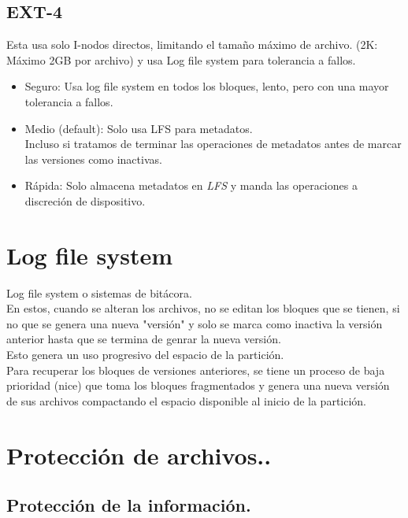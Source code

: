 \section{EXT-4}
Esta usa solo I-nodos directos, limitando el tama\~{n}o m\'{a}ximo de archivo.
(2K: M\'{a}ximo 2GB por archivo) y usa Log file system para tolerancia a fallos.
\begin{itemize}
	\item Seguro: Usa log file system en todos los bloques, lento, pero con una mayor tolerancia a fallos.
	\item Medio (default): Solo usa LFS para metadatos.\\
		Incluso si tratamos de terminar las operaciones de metadatos antes de marcar las versiones como inactivas.
	\item R\'{a}pida: Solo almacena metadatos en \textit{LFS} y manda las operaciones a discreci\'{o}n de dispositivo.
\end{itemize}

\chapter{Log file system}
Log file system o sistemas de bit\'{a}cora.\\
En estos, cuando se alteran los archivos, no se editan los bloques que se tienen, si no que se genera una nueva "versi\'{o}n" y solo se marca como inactiva la versi\'{o}n anterior hasta que se termina de genrar la nueva versi\'{o}n.\\
Esto genera un uso progresivo del espacio de la partici\'{o}n.\\
Para recuperar los bloques de versiones anteriores, se tiene un proceso de baja prioridad (nice) que toma los bloques fragmentados y genera una nueva versi\'{o}n de sus archivos compactando el espacio disponible al inicio de la partici\'{o}n.

\chapter{Protecci\'{o}n de archivos..}
\section{Protecci\'{o}n de la informaci\'{o}n.}

